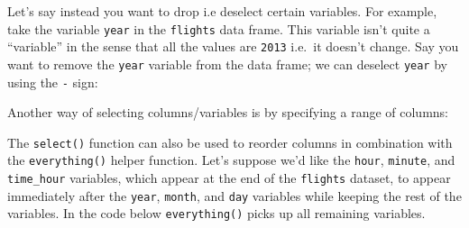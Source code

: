 \documentclass[12pt, krantz2,]{krantz}
\makeatletter
\newenvironment{Shaded}{\begin{snugshade}}{\end{snugshade}}
\newcommand{\KeywordTok}[1]{\textcolor[rgb]{0.27,0.27,0.27}{\textbf{#1}}}
\newcommand{\NormalTok}[1]{#1}
\newcommand{\OperatorTok}[1]{\textcolor[rgb]{0.43,0.43,0.43}{\textbf{#1}}}
\newcommand{\StringTok}[1]{\textcolor[rgb]{0.5,0.5,0.5}{#1}}
\newenvironment{kframe}{%
\medskip{}
\setlength{\fboxsep}{.8em}
 \def\at@end@of@kframe{}%
 \ifinner\ifhmode%
  \def\at@end@of@kframe{\end{minipage}}%
  \begin{minipage}{\columnwidth}%
 \fi\fi%
 \def\FrameCommand##1{\hskip\@totalleftmargin \hskip-\fboxsep
 \colorbox{shadecolor}{##1}\hskip-\fboxsep
     \hskip-\linewidth \hskip-\@totalleftmargin \hskip\columnwidth}%
 \MakeFramed {\advance\hsize-\width
   \@totalleftmargin\z@ \linewidth\hsize
   \@setminipage}}%
 {\par\unskip\endMakeFramed%
 \at@end@of@kframe}
\renewenvironment{Shaded}{\begin{kframe}}{\end{kframe}}
\makeatother
\begin{document}
Let's say instead you want to drop i.e deselect certain variables. For example, take the variable \texttt{year} in the \texttt{flights} data frame. This variable isn't quite a ``variable'' in the sense that all the values are \texttt{2013} i.e.~it doesn't change. Say you want to remove the \texttt{year} variable from the data frame; we can deselect \texttt{year} by using the \texttt{-} sign:

\begin{Shaded}
\end{Shaded}

Another way of selecting columns/variables is by specifying a range of columns:

\begin{Shaded}
\end{Shaded}

The \texttt{select()} function can also be used to reorder columns in combination with the \texttt{everything()} helper function. Let's suppose we'd like the \texttt{hour}, \texttt{minute}, and \texttt{time\_hour} variables, which appear at the end of the \texttt{flights} dataset, to appear immediately after the \texttt{year}, \texttt{month}, and \texttt{day} variables while keeping the rest of the variables. In the code below \texttt{everything()} picks up all remaining variables.

\begin{Shaded}
\end{Shaded}
\end{document}
